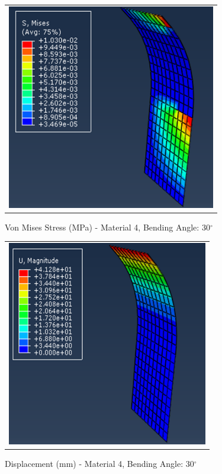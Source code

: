 \documentclass[a4paper,12pt]{article}
\numberwithin{equation}{section}
\numberwithin{figure}{section}
\begin{document}
\begin{figure}[H]
  \centering
  \begin{tabular}{@{}c@{}}
    \includegraphics[width=0.7\linewidth,height=255pt]{Results/Bending/M4_VMS_30.png} \\
  \end{tabular}
  \caption{Von Mises Stress (MPa) - Material 4,  Bending Angle: 30$^{\circ}$ }
\end{figure}

\begin{figure}[H]
  \centering
  \begin{tabular}{@{}c@{}}
    \includegraphics[width=0.7\linewidth,height=255pt]{Results/Bending/M4_DIS_30.png} \\
  \end{tabular}
  \caption{Displacement (mm) - Material 4, Bending Angle: 30$^{\circ}$ }
\end{figure}
\end{document}
